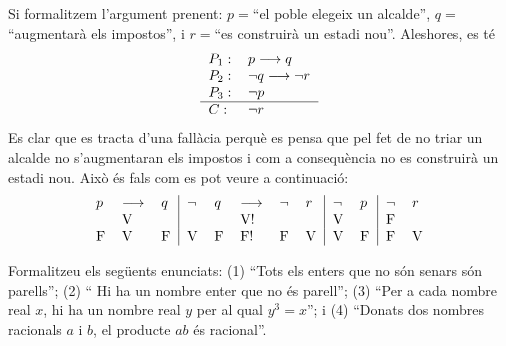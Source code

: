 \begin{solucio}
Si formalitzem l'argument prenent: $p=$\textquotedblleft el poble elegeix un
alcalde\textquotedblright, $q=$\textquotedblleft augmentar\`{a} els
impostos\textquotedblright, i $r=$\textquotedblleft es construir\`{a} un
estadi nou\textquotedblright. Aleshores, es t\'{e}%
\[%
\begin{tabular}
[c]{ll}%
$P_{1}:$ & $p\longrightarrow q$\\
$P_{2}:$ & $\lnot q\longrightarrow\lnot r$\\
$P_{3}:$ & $\lnot p$\\\hline
$C:$ & $\lnot r$%
\end{tabular}
\]
Es clar que es tracta d'una fal\textperiodcentered l\`{a}cia perqu\`{e} es
pensa que pel fet de no triar un alcalde no s'augmentaran els impostos i com a
consequ\`{e}ncia no es construir\`{a} un estadi nou. Aix\`{o} \'{e}s fals com
es pot veure a continuaci\'{o}:%
\[%
\begin{tabular}
[c]{lll|lllll|ll|ll}%
$p$ & $\longrightarrow$ & $q$ & $\lnot$ & $q$ & $\longrightarrow$ & $\lnot$ &
$r$ & $\lnot$ & $p$ & $\lnot$ & $r$\\
& V &  &  &  & V! &  &  & V &  & F & \\
F & V & F & V & F & F! & F & V & V & F & F & V
\end{tabular}
\]

\end{solucio}

\begin{exer}
Formalitzeu els seg\"{u}ents enunciats: (1) \textquotedblleft Tots els enters
que no s\'{o}n senars s\'{o}n parells\textquotedblright; (2) \textquotedblleft
Hi ha un nombre enter que no \'{e}s parell\textquotedblright; (3)
\textquotedblleft Per a cada nombre real $x$, hi ha un nombre real $y$ per al
qual $y^{3}=x$\textquotedblright; i (4) \textquotedblleft Donats dos nombres
racionals $a$ i $b$, el producte $ab$ \'{e}s racional\textquotedblright.
\end{exer}

